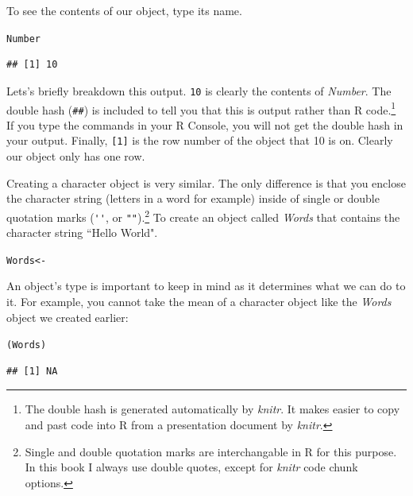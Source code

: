 \documentclass[krantz1]{krantz}
\begin{document}
\noindent To see the contents of our object, type its name.

\begin{knitrout}
\color{fgcolor}\begin{kframe}
\begin{alltt}
Number
\end{alltt}
\begin{verbatim}
## [1] 10
\end{verbatim}
\end{kframe}
\end{knitrout}


\noindent Lets's briefly breakdown this output. \texttt{10} is clearly the contents of {\emph{Number}}. The double hash (\texttt{\#\#}) is included to tell you that this is output rather than R code.\footnote{The double hash is generated automatically by {\emph{knitr}}. It makes easier to copy and past code into R from a presentation document by {\emph{knitr}}.} If you type the commands in your R Console, you will not get the double hash in your output. Finally, \texttt{[1]} is the row number of the object that 10 is on. Clearly our object only has one row.   

Creating a character object is very similar. The only difference is that you enclose the character string (letters in a word for example) inside of single or double quotation marks (\verb|''|, or \verb|""|).\footnote{Single and double quotation marks are interchangable in R for this purpose. In this book I always use double quotes, except for \emph{knitr} code chunk options.} To create an object called \emph{Words} that contains the character string ``Hello World".\label{StringObject}

\begin{knitrout}
\color{fgcolor}\begin{kframe}
\begin{alltt}
Words <- 
\end{alltt}
\end{kframe}
\end{knitrout}


An object's type is important to keep in mind as it determines what we can do to it. For example, you cannot take the mean of a character object like the {\emph{Words}} object we created earlier:

\begin{knitrout}
\color{fgcolor}\begin{kframe}
\begin{alltt}
(Words)
\end{alltt}


{\ttfamily\noindent\color{warningcolor}{\#\# Warning: argument is not numeric or logical: returning NA}}\begin{verbatim}
## [1] NA
\end{verbatim}
\end{kframe}
\end{knitrout}
\end{document}
